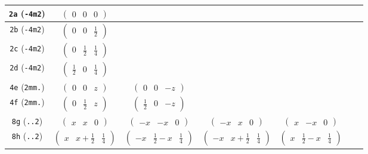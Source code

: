 \documentclass[fleqn,9pt,landscape]{jsarticle}
\begin{document}
\begin{center}
\begin{longtable}{ccccccc}
{\tt 2a} ({\tt -4m2}) & $ \begin{pmatrix} 0 & 0 & 0 \end{pmatrix} $ & $  $ & $  $ & $  $ & $  $ & $  $ \\ \hline
{\tt 2b} ({\tt -4m2}) & $ \begin{pmatrix} 0 & 0 & \frac{1}{2} \end{pmatrix} $ & $  $ & $  $ & $  $ & $  $ & $  $ \\ \hline
{\tt 2c} ({\tt -4m2}) & $ \begin{pmatrix} 0 & \frac{1}{2} & \frac{1}{4} \end{pmatrix} $ & $  $ & $  $ & $  $ & $  $ & $  $ \\ \hline
{\tt 2d} ({\tt -4m2}) & $ \begin{pmatrix} \frac{1}{2} & 0 & \frac{1}{4} \end{pmatrix} $ & $  $ & $  $ & $  $ & $  $ & $  $ \\ \hline
{\tt 4e} ({\tt 2mm.}) & $ \begin{pmatrix} 0 & 0 & z \end{pmatrix} $ & $ \begin{pmatrix} 0 & 0 & - z \end{pmatrix} $ & $  $ & $  $ & $  $ & $  $ \\ \hline
{\tt 4f} ({\tt 2mm.}) & $ \begin{pmatrix} 0 & \frac{1}{2} & z \end{pmatrix} $ & $ \begin{pmatrix} \frac{1}{2} & 0 & - z \end{pmatrix} $ & $  $ & $  $ & $  $ & $  $ \\ \hline
{\tt 8g} ({\tt ..2}) & $ \begin{pmatrix} x & x & 0 \end{pmatrix} $ & $ \begin{pmatrix} - x & - x & 0 \end{pmatrix} $ & $ \begin{pmatrix} - x & x & 0 \end{pmatrix} $ & $ \begin{pmatrix} x & - x & 0 \end{pmatrix} $ & $  $ & $  $ \\ \hline
{\tt 8h} ({\tt ..2}) & $ \begin{pmatrix} x & x + \frac{1}{2} & \frac{1}{4} \end{pmatrix} $ & $ \begin{pmatrix} - x & \frac{1}{2} - x & \frac{1}{4} \end{pmatrix} $ & $ \begin{pmatrix} - x & x + \frac{1}{2} & \frac{1}{4} \end{pmatrix} $ & $ \begin{pmatrix} x & \frac{1}{2} - x & \frac{1}{4} \end{pmatrix} $ & $  $ & $  $ \\ \hline

\end{longtable}
\end{center}
\end{document}
